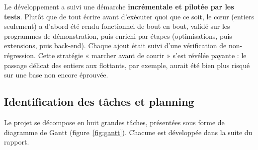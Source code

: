 Le développement a suivi une démarche \textbf{incrémentale et pilotée par les
tests}. Plutôt que de tout écrire avant d'exécuter quoi que ce soit, le c\oe ur
(entiers seulement) a d'abord été rendu fonctionnel de bout en bout, validé sur
les programmes de démonstration, puis enrichi par étapes (optimisations, puis
extensions, puis back-end). Chaque ajout était suivi d'une vérification de
non-régression. Cette stratégie « marcher avant de courir » s'est révélée
payante : le passage délicat des entiers aux flottants, par exemple, aurait été
bien plus risqué sur une base non encore éprouvée.

\subsection{Identification des tâches et planning}

Le projet se décompose en huit grandes tâches, présentées sous forme de diagramme
de Gantt (figure~\ref{fig:gantt}). Chacune est développée dans la suite du
rapport.


